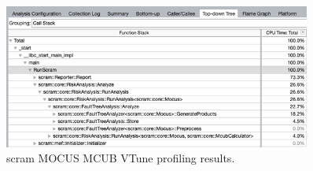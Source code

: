 \begin{figure}[H]
    \centering
    \includegraphics[width=0.9\textwidth]{3_identifying_gaps/benchmarking/profiling_methods/figures/vtune_scram_mocus_mcub.png}
    \caption{scram MOCUS MCUB VTune profiling results.}
    \label{fig:vtune_scram_mocus_mcub}
\end{figure}